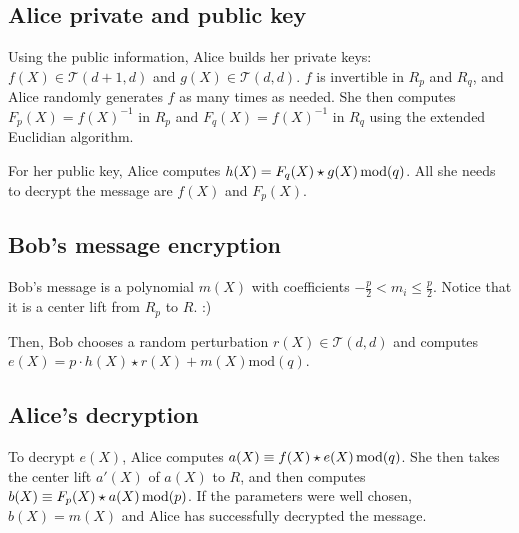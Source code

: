 \documentclass[12pt]{article}
\theoremstyle{definition}
\theoremstyle{proposition}
\theoremstyle{remark}
\theoremstyle{theorem}
\theoremstyle{example}
\newcommand{\cT}{\mathcal{T}}
\begin{document}
\subsection*{Alice private and public key}

Using the public information, Alice builds her private keys: $f(X) \in \cT(d+1,d)$ and $g(X) \in \cT(d,d)$. $f$ is invertible in $R_p$ and $R_q$, and Alice randomly generates $f$ as many times as needed. She then computes $F_p(X) = f(X)^{-1}$ in $R_p$ and $F_q(X) = f(X)^{-1}$ in $R_q$ using the extended Euclidian algorithm.

For her public key, Alice computes $h(X) = F_q(X) \star g(X) \thinspace \mathrm{mod}(q)$. All she needs to decrypt the message are $f(X)$ and $F_p(X)$.

\subsection*{Bob's message encryption}

Bob's message is a polynomial $m(X)$ with coefficients $-\frac{p}{2} < m_i \leq \frac{p}{2}$. Notice that it is a center lift from $R_p$ to $R$. :)

Then, Bob chooses a random perturbation $r(X) \in \cT(d,d)$ and computes $e(X) = p \cdot h(X) \star r(X) + m(X) \mathrm{mod}(q)$. 

\subsection*{Alice's decryption}

To decrypt $e(X)$, Alice computes $a(X) \equiv f(X) \star e(X) \thinspace \mathrm{mod}(q)$. She then takes the center lift $a'(X)$ of $a(X)$ to $R$, and then computes $b(X) \equiv F_p(X) \star a(X) \thinspace \mathrm{mod}(p)$. If the parameters were well chosen, $b(X) = m(X)$ and Alice has successfully decrypted the message.
\end{document}
